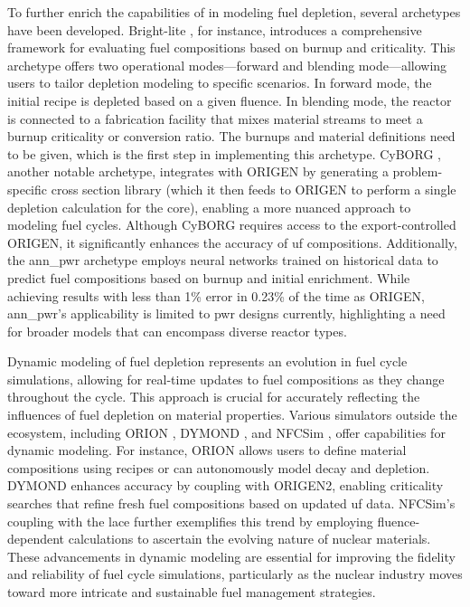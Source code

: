 To further enrich the capabilities of \cyclus in modeling fuel depletion,
several archetypes have been developed. Bright-lite
\cite{schneider_integrated_2016}, for instance, introduces a comprehensive
framework for evaluating fuel compositions based on burnup and criticality.
This archetype offers two operational modes—forward and blending mode—allowing
users to tailor depletion modeling to specific scenarios. In forward mode, the
initial recipe is depleted based on a given fluence. In blending mode, the
reactor is connected to a fabrication facility that mixes material streams to
meet a burnup criticality or conversion ratio. The burnups and material
definitions need to be given, which is the first step in implementing this
archetype. CyBORG \cite{skutnik_cyborg_2016}, another notable archetype,
integrates \cyclus with ORIGEN by generating a problem-specific cross section
library (which it then feeds to ORIGEN to perform a single depletion
calculation for the core), enabling a more nuanced approach to modeling fuel
cycles. Although CyBORG requires access to the export-controlled ORIGEN, it
significantly enhances the accuracy of \gls{uf} compositions. Additionally, the
ann\_pwr \cite{bae_deep_2020} archetype employs neural networks trained on
historical data to predict fuel compositions based on burnup and initial
enrichment. While achieving results with less than 1\% error in 0.23\% of the
time as ORIGEN, ann\_pwr's applicability is limited to \gls{pwr} designs
currently, highlighting a need for broader models that can encompass diverse
reactor types.

Dynamic modeling of fuel depletion represents an evolution in fuel cycle
simulations, allowing for real-time updates to fuel compositions as they change
throughout the cycle. This approach is crucial for accurately reflecting the
influences of fuel depletion on material properties. Various simulators outside
the \cyclus ecosystem, including ORION \cite{feng_standardized_2016}, DYMOND
\cite{richards_application_2021}, and NFCSim \cite{schneider_nfcsim_2005},
offer capabilities for dynamic modeling. For instance, ORION allows users to
define material compositions using recipes or can autonomously model decay and
depletion. DYMOND enhances accuracy by coupling with ORIGEN2, enabling
criticality searches that refine fresh fuel compositions based on updated
\gls{uf} data. NFCSim's coupling with the \gls{lace} further exemplifies this
trend by employing fluence-dependent calculations to ascertain the evolving
nature of nuclear materials. These advancements in dynamic modeling are
essential for improving the fidelity and reliability of fuel cycle simulations,
particularly as the nuclear industry moves toward more intricate and
sustainable fuel management strategies.

